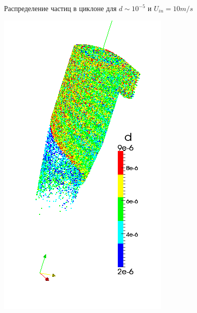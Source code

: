 \begin{figure}[h]
\begin{minipage}{0.475\linewidth}
		\caption{Распределение частиц в циклоне для $d \sim 10^{-5}$ и $U_{in} = 10m/s$}
		\label{fig:parcelsCyclone4}
	\end{minipage}
\end{figure}
 \begin{figure}[h]
 	\centering
 	\vspace{-4em}
 	\hspace{-1em}
	\begin{minipage}{0.2\linewidth}
		\includegraphics[scale=0.3]{t1}
	\end{minipage}
	\hspace{-1em}
	\begin{minipage}{0.2\linewidth}

\end{minipage}
\end{figure}
